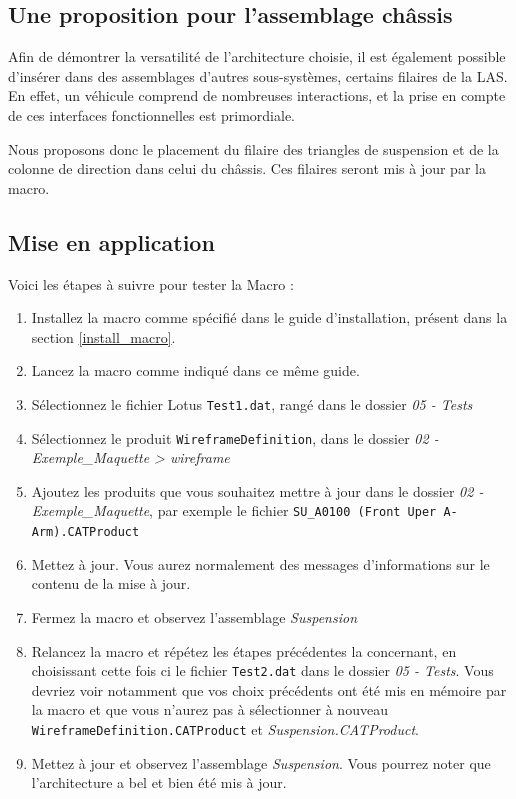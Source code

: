 \subsection{Une proposition pour l'assemblage châssis} %

\par Afin de démontrer la versatilité de l'architecture choisie, il est également possible d'insérer dans des assemblages d'autres sous-systèmes, certains filaires de la LAS. 
En effet, un véhicule comprend de nombreuses interactions, et la prise en compte de ces interfaces fonctionnelles est primordiale.

\par Nous proposons donc le placement du filaire des triangles de suspension et de la colonne de direction dans celui du châssis. Ces filaires seront mis à jour par la macro.

\subsection{Mise en application}

Voici les étapes à suivre pour tester la Macro :
\begin{enumerate}
    \item Installez la macro comme spécifié dans le guide d'installation, présent dans la section \ref{install_macro}.
    \item Lancez la macro comme indiqué dans ce même guide.
    \item Sélectionnez le fichier Lotus \texttt{Test1.dat}, rangé dans le dossier \textit{05 - Tests}
    \item Sélectionnez le produit \texttt{WireframeDefinition}, dans le dossier \textit{02 - Exemple\_Maquette > wireframe}
    \item Ajoutez les produits que vous souhaitez mettre à jour dans le dossier \textit{02 - Exemple\_Maquette}, par exemple le fichier \texttt{SU\_A0100 (Front Uper A-Arm).CATProduct}
    \item Mettez à jour. Vous aurez normalement des messages d'informations sur le contenu de la mise à jour.
    \item Fermez la macro et observez l'assemblage \textit{Suspension}
    \item Relancez la macro et répétez les étapes précédentes la concernant, en choisissant cette fois ci le fichier \texttt{Test2.dat} dans le dossier \textit{05 - Tests}. Vous devriez voir notamment que vos choix précédents ont été mis en mémoire par la macro et que vous n'aurez pas à sélectionner à nouveau \texttt{WireframeDefinition.CATProduct} et \textit{Suspension.CATProduct}.
    \item Mettez à jour et observez l'assemblage \textit{Suspension}. Vous pourrez noter que l'architecture a bel et bien été mis à jour.
\end{enumerate}


